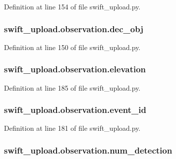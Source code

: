 Definition at line 154 of file swift\-\_\-upload.\-py.

\hypertarget{classswift__upload_1_1observation_a2ca67fdaf250b67b7ee097b51a271d76}{
\subsubsection[{dec\-\_\-obj}]{\setlength{\rightskip}{0pt plus 5cm}swift\-\_\-upload.\-observation.\-dec\-\_\-obj}}\label{classswift__upload_1_1observation_a2ca67fdaf250b67b7ee097b51a271d76}


Definition at line 150 of file swift\-\_\-upload.\-py.

\hypertarget{classswift__upload_1_1observation_a4c3683d21e549cdc34edf5d3dc5dac03}{
\subsubsection[{elevation}]{\setlength{\rightskip}{0pt plus 5cm}swift\-\_\-upload.\-observation.\-elevation}}\label{classswift__upload_1_1observation_a4c3683d21e549cdc34edf5d3dc5dac03}


Definition at line 185 of file swift\-\_\-upload.\-py.

\hypertarget{classswift__upload_1_1observation_ae289f11447bfe0bd135c5a25678a7b02}{
\subsubsection[{event\-\_\-id}]{\setlength{\rightskip}{0pt plus 5cm}swift\-\_\-upload.\-observation.\-event\-\_\-id}}\label{classswift__upload_1_1observation_ae289f11447bfe0bd135c5a25678a7b02}


Definition at line 181 of file swift\-\_\-upload.\-py.

\hypertarget{classswift__upload_1_1observation_ada5a57666f3fadbec980707149d07828}{
\subsubsection[{num\-\_\-detection}]{\setlength{\rightskip}{0pt plus 5cm}swift\-\_\-upload.\-observation.\-num\-\_\-detection}}\label{classswift__upload_1_1observation_ada5a57666f3fadbec980707149d07828}


